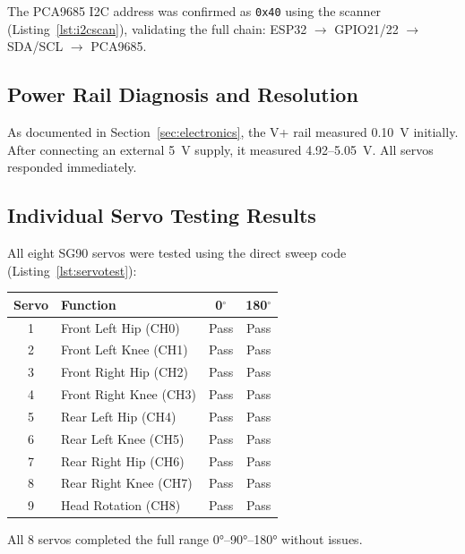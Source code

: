 \documentclass[12pt, a4paper]{article}
\begin{document}
The PCA9685 I2C address was confirmed as \texttt{0x40} using the scanner
(Listing~\ref{lst:i2cscan}), validating the full chain:
ESP32 $\rightarrow$ GPIO21/22 $\rightarrow$ SDA/SCL $\rightarrow$ PCA9685.

\subsection{Power Rail Diagnosis and Resolution}

As documented in Section~\ref{sec:electronics}, the V+ rail measured 0.10~V
initially. After connecting an external 5~V supply, it measured 4.92--5.05~V.
All servos responded immediately.

\subsection{Individual Servo Testing Results}

All eight SG90 servos were tested using the direct sweep code
(Listing~\ref{lst:servotest}):

\begin{center}
\begin{tabularx}{\textwidth}{|c|X|c|c|}
\hline
\textbf{Servo} & \textbf{Function} & \textbf{0$^\circ$} & \textbf{180$^\circ$} \\
\hline
1 & Front Left Hip (CH0)   & \color{mygreen}Pass & \color{mygreen}Pass \\
2 & Front Left Knee (CH1)  & \color{mygreen}Pass & \color{mygreen}Pass \\
3 & Front Right Hip (CH2)  & \color{mygreen}Pass & \color{mygreen}Pass \\
4 & Front Right Knee (CH3) & \color{mygreen}Pass & \color{mygreen}Pass \\
5 & Rear Left Hip (CH4)    & \color{mygreen}Pass & \color{mygreen}Pass \\
6 & Rear Left Knee (CH5)   & \color{mygreen}Pass & \color{mygreen}Pass \\
7 & Rear Right Hip (CH6)   & \color{mygreen}Pass & \color{mygreen}Pass \\
8 & Rear Right Knee (CH7)  & \color{mygreen}Pass & \color{mygreen}Pass \\
9 & Head Rotation (CH8)    & \color{mygreen}Pass & \color{mygreen}Pass \\
\hline
\end{tabularx}
\end{center}

All 8 servos completed the full range 0°--90°--180° without issues.
\end{document}
